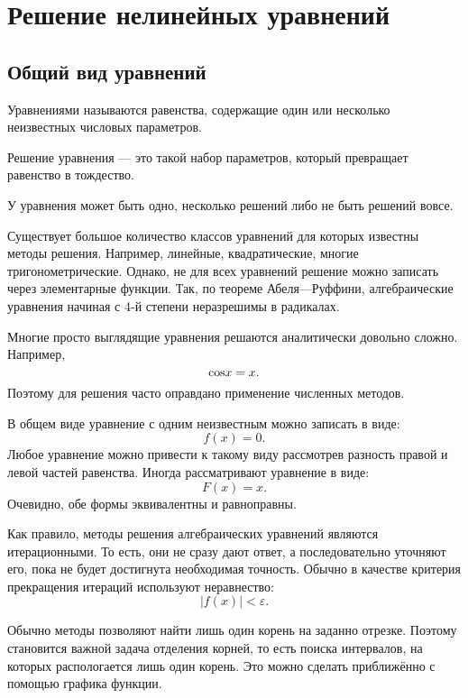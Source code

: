\section{Решение нелинейных уравнений}


\subsection{Общий вид уравнений}
\begin{defn}
Уравнениями называются равенства, содержащие один или несколько
неизвестных числовых параметров.
\end{defn}

\begin{defn}
  Решение уравнения — это такой набор параметров, который превращает
  равенство в тождество.
\end{defn}

У уравнения может быть одно, несколько решений либо не быть решений
вовсе.

Существует большое количество классов уравнений для которых известны
методы решения. Например, линейные, квадратические, многие
тригонометрические.  Однако, не для всех уравнений решение можно
записать через элементарные функции. Так, по теореме Абеля—Руффини,
алгебраические уравнения начиная с 4-й степени неразрешимы в
радикалах.

Многие просто выглядящие уравнения решаются аналитически довольно
сложно. Например,
\[
\text{\ensuremath{\cos}}x=x.
\]
Поэтому для решения часто оправдано применение численных методов.

В общем виде уравнение с одним неизвестным можно записать в виде:
\[
f(x)=0.
\]
Любое уравнение можно привести к такому виду рассмотрев разность
правой и левой частей равенства. Иногда рассматривают уравнение в
виде:
\[
F(x)=x.
\]
Очевидно, обе формы эквивалентны и равноправны.

Как правило, методы решения алгебраических уравнений являются
итерационными.  То есть, они не сразу дают ответ, а последовательно
уточняют его, пока не будет достигнута необходимая точность. Обычно в
качестве критерия прекращения итераций используют неравнество:
\[
|f(x)|<\varepsilon.
\]


Обычно методы позволяют найти лишь один корень на заданно отрезке.
Поэтому становится важной задача отделения корней, то есть поиска
интервалов, на которых распологается лишь один корень. Это можно
сделать приближённо с помощью графика функции.


